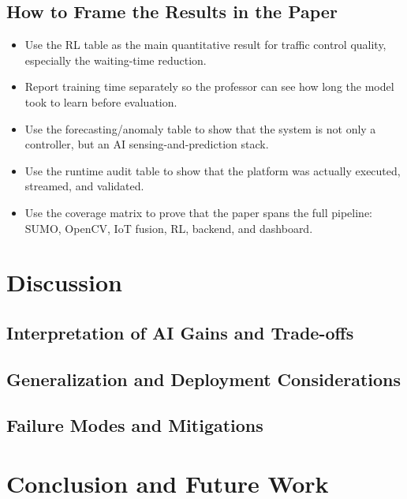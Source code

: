 \documentclass[conference]{IEEEtran}
\begin{document}
\subsection{How to Frame the Results in the Paper}
\begin{itemize}[leftmargin=*]
	\item Use the RL table as the main quantitative result for traffic control quality, especially the waiting-time reduction.
	\item Report training time separately so the professor can see how long the model took to learn before evaluation.
	\item Use the forecasting/anomaly table to show that the system is not only a controller, but an AI sensing-and-prediction stack.
	\item Use the runtime audit table to show that the platform was actually executed, streamed, and validated.
	\item Use the coverage matrix to prove that the paper spans the full pipeline: SUMO, OpenCV, IoT fusion, RL, backend, and dashboard.
\end{itemize}

\section{Discussion}
\subsection{Interpretation of AI Gains and Trade-offs}

\subsection{Generalization and Deployment Considerations}

\subsection{Failure Modes and Mitigations}

\section{Conclusion and Future Work}
\end{document}
